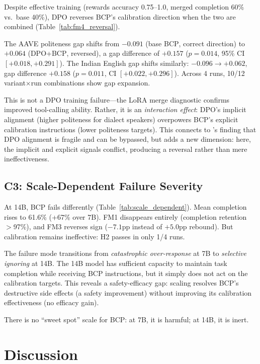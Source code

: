\documentclass[11pt,a4paper]{article}
\newcommand{\fm}[1]{\textsc{FM#1}}
\newcommand{\bcp}{\textsc{BCP}}
\begin{document}
Despite effective training (rewards accuracy 0.75--1.0, merged completion 60\% vs.\ base 40\%), DPO reverses \bcp{}'s calibration direction when the two are combined (Table~\ref{tab:fm4_reversal}).

The AAVE politeness gap shifts from $-0.091$ (base \bcp{}, correct direction) to $+0.064$ (DPO+\bcp{}, reversed), a gap difference of $+0.157$ ($p = 0.014$, 95\% CI $[+0.018, +0.291]$).
The Indian English gap shifts similarly: $-0.096 \to +0.062$, gap difference $+0.158$ ($p = 0.011$, CI $[+0.022, +0.296]$).
Across 4 runs, 10/12 variant$\times$run combinations show gap expansion.

This is not a DPO training failure---the LoRA merge diagnostic confirms improved tool-calling ability.
Rather, it is an \emph{interaction effect}: DPO's implicit alignment (higher politeness for dialect speakers) overpowers \bcp{}'s explicit calibration instructions (lower politeness targets).
This connects to \citet{lee2024dpo_toxicity}'s finding that DPO alignment is fragile and can be bypassed, but adds a new dimension: here, the implicit and explicit signals conflict, producing a reversal rather than mere ineffectiveness.

\subsection{C3: Scale-Dependent Failure Severity}
\label{sec:results_c3}

At 14B, \bcp{} fails differently (Table~\ref{tab:scale_dependent}).
Mean completion rises to 61.6\% (+67\% over 7B).
\fm{1} disappears entirely (completion retention $>$97\%), and \fm{3} reverses sign ($-7.1$pp instead of $+5.0$pp rebound).
But calibration remains ineffective: H2 passes in only 1/4 runs.

The failure mode transitions from \emph{catastrophic over-response} at 7B to \emph{selective ignoring} at 14B.
The 14B model has sufficient capacity to maintain task completion while receiving \bcp{} instructions, but it simply does not act on the calibration targets.
This reveals a safety-efficacy gap: scaling resolves \bcp{}'s destructive side effects (a safety improvement) without improving its calibration effectiveness (no efficacy gain).

There is no ``sweet spot'' scale for \bcp{}: at 7B, it is harmful; at 14B, it is inert.

\section{Discussion}
\label{sec:discussion}
\end{document}
